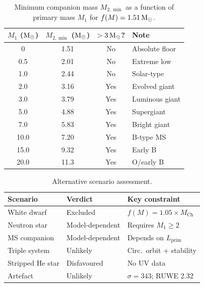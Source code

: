 \documentclass[usenatbib,fleqn]{mnras}
\newcommand{\Msun}{{\rm M}_\odot}
\newcommand{\fmass}{f(M)}
\begin{document}
\begin{table}
\centering
\caption{Minimum companion mass $M_{2,\min}$ as a function of
primary mass $M_1$ for $\fmass = 1.51\,\Msun$.}
\label{tab:m2_vs_m1}
\begin{tabular}{cccl}
\toprule
$M_1$ ($\Msun$) & $M_{2,\min}$ ($\Msun$) & $> 3\,\Msun$? & Note \\
\midrule
0     & 1.51 & No   & Absolute floor \\
0.5   & 2.01 & No   & Extreme low \\
1.0   & 2.44 & No   & Solar-type \\
2.0   & 3.16 & Yes  & Evolved giant \\
3.0   & 3.79 & Yes  & Luminous giant \\
5.0   & 4.88 & Yes  & Supergiant \\
7.0   & 5.83 & Yes  & Bright giant \\
10.0  & 7.20 & Yes  & B-type MS \\
15.0  & 9.32 & Yes  & Early B \\
20.0  & 11.3 & Yes  & O/early B \\
\bottomrule
\end{tabular}
\end{table}

\begin{table}
\centering
\caption{Alternative scenario assessment.}
\label{tab:scenarios}
\begin{tabular}{lll}
\toprule
Scenario & Verdict & Key constraint \\
\midrule
White dwarf      & Excluded         & $\fmass = 1.05 \times M_\mathrm{Ch}$ \\
Neutron star     & Model-dependent  & Requires $M_1 \ge 2$ \\
MS companion     & Model-dependent  & Depends on $L_\mathrm{prim}$ \\
Triple system    & Unlikely         & Circ.\ orbit + stability \\
Stripped He star & Disfavoured      & No UV data \\
Artefact         & Unlikely         & $\sigma = 343$; RUWE 2.32 \\
\bottomrule
\end{tabular}
\end{table}
\end{document}
